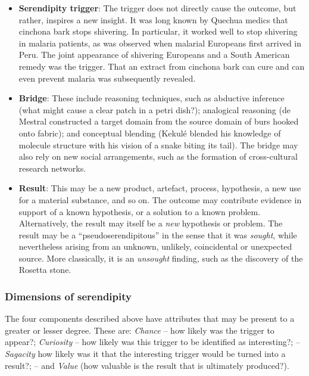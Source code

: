 \begin{itemize}
\item \textbf{Serendipity trigger}: The trigger does not directly
  cause the outcome, but rather, inspires a new insight.  It was long
  known by Quechua medics that cinchona bark stops shivering.  In
  particular, it worked well to stop shivering in malaria patients, as
  was observed when malarial Europeans first arrived in Peru.  The
  joint appearance of shivering Europeans and a South American remedy
  was the trigger.  That an extract from cinchona bark can cure and
  can even prevent malaria was subsequently revealed.
\end{itemize}

\begin{itemize}
\item \textbf{Bridge}: These include reasoning techniques, such as
  abductive inference (what might cause a clear patch in a petri
  dish?); analogical reasoning (de Mestral constructed a target domain
  from the source domain of burs hooked onto fabric); and conceptual
  blending (Kekul\'e blended his knowledge of molecule structure with
  his vision of a snake biting its tail).  The bridge may also rely on
  new social arrangements, such as the formation of cross-cultural
  research networks.
\end{itemize}

\begin{itemize}
\item \textbf{Result}: This may be a new product, artefact, process,
  hypothesis, a new use for a material substance, and so on.  The
  outcome may contribute evidence in support of a known hypothesis, or
  a solution to a known problem.  Alternatively, the result may itself
  be a {\em new} hypothesis or problem.  The result may be a
  ``pseudoserendipitous'' in the sense that it was {\em sought}, while
  nevertheless arising from an unknown, unlikely, coincidental or
  unexpected source.  More classically, it is an \emph{unsought}
  finding, such as the discovery of the Rosetta stone.
\end{itemize}

\subsubsection*{Dimensions of serendipity}

The four components described above have attributes that may be present to a greater or lesser degree.  These are: \emph{Chance} -- how likely was the trigger to appear?; \emph{Curiosity} -- how likely was this trigger to be identified as interesting?; -- \emph{Sagacity} how likely was it that the interesting trigger would be turned into a result?; -- and \emph{Value} (how valuable is the result that is ultimately produced?).

